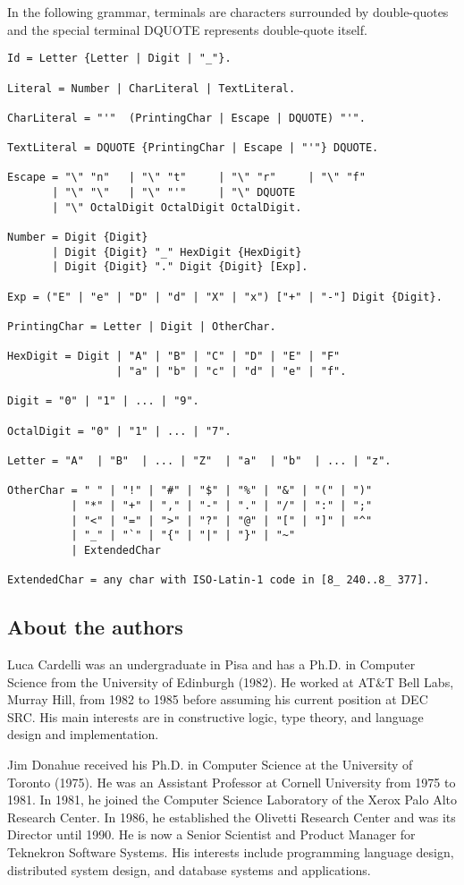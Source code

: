 \documentclass[10pt]{article}
\begin{document}
In the following grammar, terminals are characters surrounded by double-quotes
and the special terminal DQUOTE represents double-quote itself.

\begin{verbatim}
Id = Letter {Letter | Digit | "_"}.

Literal = Number | CharLiteral | TextLiteral.

CharLiteral = "'"  (PrintingChar | Escape | DQUOTE) "'".

TextLiteral = DQUOTE {PrintingChar | Escape | "'"} DQUOTE.

Escape = "\" "n"   | "\" "t"     | "\" "r"     | "\" "f"
       | "\" "\"   | "\" "'"     | "\" DQUOTE
       | "\" OctalDigit OctalDigit OctalDigit.

Number = Digit {Digit}
       | Digit {Digit} "_" HexDigit {HexDigit}
       | Digit {Digit} "." Digit {Digit} [Exp].

Exp = ("E" | "e" | "D" | "d" | "X" | "x") ["+" | "-"] Digit {Digit}.

PrintingChar = Letter | Digit | OtherChar.

HexDigit = Digit | "A" | "B" | "C" | "D" | "E" | "F"
                 | "a" | "b" | "c" | "d" | "e" | "f".

Digit = "0" | "1" | ... | "9".

OctalDigit = "0" | "1" | ... | "7".

Letter = "A"  | "B"  | ... | "Z"  | "a"  | "b"  | ... | "z".

OtherChar = " " | "!" | "#" | "$" | "%" | "&" | "(" | ")"
          | "*" | "+" | "," | "-" | "." | "/" | ":" | ";"
          | "<" | "=" | ">" | "?" | "@" | "[" | "]" | "^"
          | "_" | "`" | "{" | "|" | "}" | "~"
          | ExtendedChar

ExtendedChar = any char with ISO-Latin-1 code in [8_ 240..8_ 377].
\end{verbatim}

\subsection*{About the authors}

Luca Cardelli was an undergraduate in Pisa and has a Ph.D. in Computer Science
from the University of Edinburgh (1982). He worked at AT\&T Bell Labs, Murray
Hill, from 1982 to 1985 before assuming his current position at DEC SRC. His
main interests are in constructive logic, type theory, and language design and
implementation.

Jim Donahue received his Ph.D. in Computer Science at the University of
Toronto (1975). He was an Assistant Professor at Cornell University from 1975
to 1981. In 1981, he joined the Computer Science Laboratory of the Xerox Palo
Alto Research Center. In 1986, he established the Olivetti Research Center and
was its Director until 1990. He is now a Senior Scientist and Product Manager
for Teknekron Software Systems. His interests include programming language
design, distributed system design, and database systems and applications.
\end{document}

